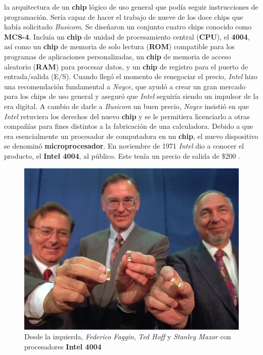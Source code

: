 la arquitectura de un \textbf{chip} lógico de uso general que podía seguir instrucciones de programación. Sería capaz de hacer el trabajo de
nueve de los doce chips que había solicitado \emph{Busicom}. Se diseñaron un conjunto cuatro chips conocido como \textbf{MCS-4}. Incluía un \textbf{chip} de
unidad de procesamiento central (\textbf{CPU}), el \textbf{4004}, así como un \textbf{chip} de memoria de solo lectura (\textbf{ROM}) compatible para los programas de
aplicaciones personalizadas, un \textbf{chip} de memoria de acceso aleatorio (\textbf{RAM}) para procesar datos, y un \textbf{chip} de registro para el puerto
de entrada/salida (E/S). Cuando llegó el momento de renegociar el precio, \emph{Intel} hizo una recomendación fundamental a \emph{Noyce}, que ayudó
a crear un gran mercado para los chips de uso general y aseguró que \emph{Intel} seguiría siendo un impulsor de la era digital. A cambio de
darle a \emph{Busicom} un buen precio, \emph{Noyce} insistió en que \emph{Intel} retuviera los derechos del nuevo \textbf{chip} y se le permitiera licenciarlo a otras 
compañías para fines distintos a la fabricación de una calculadora. Debido a que era esencialmente un procesador de computadora en un \textbf{chip},
el nuevo dispositivo se denominó \textbf{microprocesador}. En noviembre de 1971 \emph{Intel} dio a conocer el producto, el \textbf{Intel 4004}, al público.
Este tenía un precio de salida de \$200 .

\begin{figure}[htb]
	\centering
	\includegraphics[scale = 0.25]{Graphics/faggin_hoff_mazor_-4004.jpg}
	\caption{Desde la izquierda, \emph{Federico Faggin}, \emph{Ted Hoff} y \emph{Stanley Mazor} con procesadores \textbf{Intel 4004}}
	\label{fig:10}
\end{figure}

